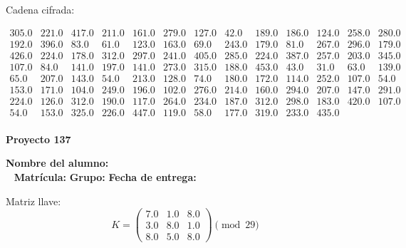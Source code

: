 \documentclass[12pt]{article}
\begin{document}
Cadena cifrada:
\begin{center}
$\begin{array}{lllllllllllll}
305.0 & 221.0 & 417.0 & 211.0 & 161.0 & 279.0 & 127.0 & 42.0 & 189.0 & 186.0 & 124.0 & 258.0 & 280.0\\
192.0 & 396.0 & 83.0 & 61.0 & 123.0 & 163.0 & 69.0 & 243.0 & 179.0 & 81.0 & 267.0 & 296.0 & 179.0\\
426.0 & 224.0 & 178.0 & 312.0 & 297.0 & 241.0 & 405.0 & 285.0 & 224.0 & 387.0 & 257.0 & 203.0 & 345.0\\
107.0 & 84.0 & 141.0 & 197.0 & 141.0 & 273.0 & 315.0 & 188.0 & 453.0 & 43.0 & 31.0 & 63.0 & 139.0\\
65.0 & 207.0 & 143.0 & 54.0 & 213.0 & 128.0 & 74.0 & 180.0 & 172.0 & 114.0 & 252.0 & 107.0 & 54.0\\
153.0 & 171.0 & 104.0 & 249.0 & 196.0 & 102.0 & 276.0 & 214.0 & 160.0 & 294.0 & 207.0 & 147.0 & 291.0\\
224.0 & 126.0 & 312.0 & 190.0 & 117.0 & 264.0 & 234.0 & 187.0 & 312.0 & 298.0 & 183.0 & 420.0 & 107.0\\
54.0 & 153.0 & 325.0 & 226.0 & 447.0 & 119.0 & 58.0 & 177.0 & 319.0 & 233.0 & 435.0\\
\end{array}$
\end{center}

\newpage


\textbf{Proyecto 137}

\textbf{Nombre del alumno:} \underline{\hspace{13cm}}\\\
\vspace{1cm}
\textbf{Matrícula:} \underline{\hspace{4cm}} \hspace{1cm}
\textbf{Grupo:} \underline{\hspace{2cm}}
\textbf{Fecha de entrega:} \underline{\hspace{2cm}}

\medskip

Matriz llave:
\[
K = \begin{pmatrix}
7.0 & 1.0 & 8.0\\
3.0 & 8.0 & 1.0\\
8.0 & 5.0 & 8.0
\end{pmatrix} \pmod{29}
\]
\end{document}
